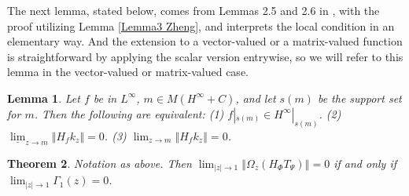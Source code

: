 \documentclass{article}%
\newtheorem{theorem}{Theorem}[section]
\newtheorem{lemma}[theorem]{Lemma}
\begin{document}
The next lemma, stated below, comes from Lemmas 2.5 and 2.6 in \cite{Gorkin},
with the proof utilizing Lemma \ref{Lemma3 Zheng}, and interprets the local
condition in an elementary way. And the extension to a vector-valued or a
matrix-valued function is straightforward by applying the scalar version
entrywise, so we will refer to this lemma in the vector-valued or
matrix-valued case.

\begin{lemma}
\label{1999Gorkin lemma} Let $f$ be in $L^{\infty}$, $m\in M\left(  H^{\infty
}+C\right)  $, and let $s(m)$ be the support set for $m$. Then the following
are equivalent: \newline(1) $f|_{s(m)}\in H^{\infty}|_{s(m)}$. \newline(2)
$\underline{\lim}_{z\rightarrow m}\left\Vert H_{f}k_{z}\right\Vert =0$.
\newline(3) ${\lim}_{z\rightarrow m}\left\Vert H_{f}k_{z}\right\Vert =0$.
\end{lemma}

\begin{theorem}
\label{crucial}Notation as above. Then $\lim_{\left\vert z\right\vert
\rightarrow1}\left\Vert \Omega_{z}(H_{\Phi}T_{\Psi})\right\Vert =0$ if and
only if $\lim_{\left\vert z\right\vert \rightarrow1}\Gamma_{1}(z)=0$.
\end{theorem}
\end{document}
